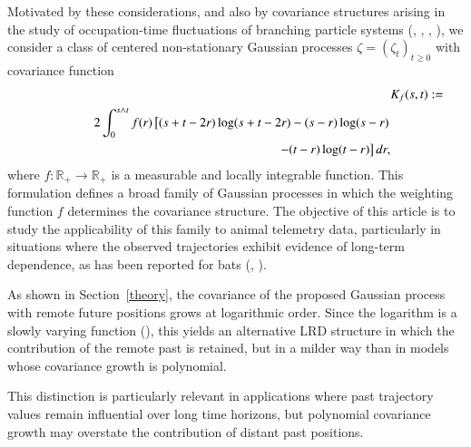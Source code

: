 \documentclass[preprint,12pt,authoryear]{elsarticle}
\begin{document}
Motivated by these considerations, and also by covariance structures arising in the study of occupation-time fluctuations of branching particle systems (\cite{BGT-SPL2004}, \cite{BGT2007}, \cite{BGT2008}, \cite{LMR2024}), we consider a class of centered non-stationary Gaussian processes \(\zeta=(\zeta_t)_{t\geq 0}\) with covariance function
\small
\begin{eqnarray}\label{critical-wegithed-covariance}
  &&\lefteqn{K_f(s,t):=}\\
  &&2\int_{0}^{s\wedge t}f(r)\left[(s+t-2r)\log(s+t-2r)-(s-r)\log(s-r)\right.\nonumber\\
  &&\hspace{3.6cm}\left.-(t-r)\log(t-r)\right]dr,\nonumber
\end{eqnarray}
\normalsize
where \(f:\mathbb{R}_{+}\to \mathbb{R}_{+}\) is a measurable and locally integrable function. This formulation defines a broad family of Gaussian processes in which the weighting function \(f\) determines the covariance structure. The objective of this article is to study the applicability of this family to animal telemetry data, particularly in situations where the observed trajectories exhibit evidence of long-term dependence, as has been reported for bats (\cite{Conenna}, \cite{Voigt2017}).

As shown in Section~\ref{theory}, the covariance of the proposed Gaussian process with remote
future positions grows at logarithmic order. Since the logarithm is a slowly varying function (\cite{BinghamGoldieTeugels1987}), this yields an alternative LRD structure in which the contribution of the remote past is retained, but in a milder way than in models whose covariance growth is polynomial.

This distinction is particularly relevant in applications where past trajectory values remain influential over long time horizons, but polynomial covariance growth may overstate the contribution of distant past positions.


\end{document}
